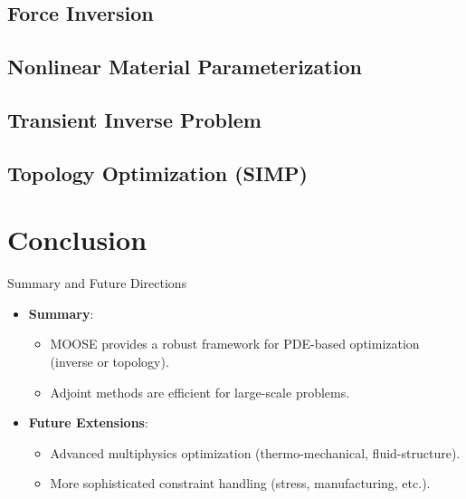 \documentclass[10pt,aspectratio=169]{beamer}
\begin{document}
\subsection{Force Inversion}


\subsection{Nonlinear Material Parameterization}

\subsection{Transient Inverse Problem}


\subsection{Topology Optimization (SIMP)}



\section{Conclusion}
\begin{frame}{Summary and Future Directions}
    \begin{itemize}
        \item \textbf{Summary}:
        \begin{itemize}
            \item MOOSE provides a robust framework for PDE-based optimization (inverse or topology).
            \item Adjoint methods are efficient for large-scale problems.
        \end{itemize}
        \item \textbf{Future Extensions}:
        \begin{itemize}
            \item Advanced multiphysics optimization (thermo-mechanical, fluid-structure).
            \item More sophisticated constraint handling (stress, manufacturing, etc.).
        \end{itemize}
    \end{itemize}
\end{frame}
\end{document}

